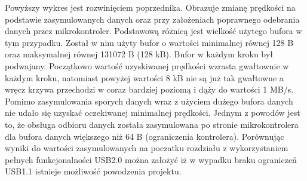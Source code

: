 \documentclass{BscUS}
\newcommand\blankpage{%
    \null
    \thispagestyle{empty}%
    \newpage}
\begin{document}
\noindent Powyższy wykres jest rozwinięciem poprzednika. Obrazuje zmianę prędkości na podstawie zasymulowanych danych oraz przy założeniach poprawnego odebrania danych przez mikrokontroler. Podstawową różnicą jest wielkość użytego bufora w tym przypadku. Został w nim użyty bufor o wartości minimalnej równej 128 B oraz maksymalnej równej 131072 B (128 kB). Bufor w każdym kroku był podwajany. Początkowo wartość uzyskiwanej prędkości wzrasta gwałtownie w każdym kroku, natomiast powyżej wartości 8 kB nie są już tak gwałtowne a wręcz krzywa przechodzi w coraz bardziej poziomą i dąży do wartości 1 MB/s. 
\newline
\indent Pomimo zasymulowania sporych danych wraz z użyciem dużego bufora danych nie udało się uzyskać oczekiwanej minimalnej prędkości. Jednym z powodów jest to, że obsługa odbioru danych została zasymulowana po stronie mikrokontrolera dla bufora danych większego niż 64 B (ograniczenia kontrolera). Porównując wyniki do wartości zasymulowanych na poczatku rozdziału z wykorzystaniem pełnych funkcjonalności USB2.0 można założyć iż w wypadku braku ograniczeń USB1.1 istnieje możliwość powodzenia projektu.
\afterpage{\blankpage}
\end{document}
